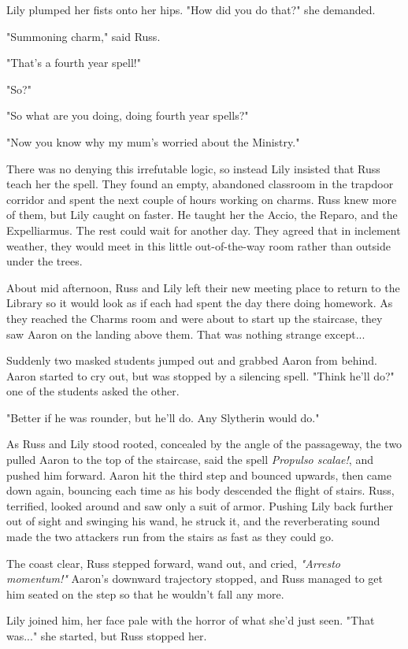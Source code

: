 \documentclass[a4paper,11pt]{article}
\begin{document}
Lily plumped her fists onto her hips. "How did you do that?" she demanded.

"Summoning charm," said Russ.

"That's a fourth year spell!"

"So?"

"So what are you doing, doing fourth year spells?"

"Now you know why my mum's worried about the Ministry."

There was no denying this irrefutable logic, so instead Lily insisted that Russ teach her the spell. They found an empty, abandoned classroom in the trapdoor corridor and spent the next couple of hours working on charms. Russ knew more of them, but Lily caught on faster. He taught her the Accio, the Reparo, and the Expelliarmus. The rest could wait for another day. They agreed that in inclement weather, they would meet in this little out-of-the-way room rather than outside under the trees.

About mid afternoon, Russ and Lily left their new meeting place to return to the Library so it would look as if each had spent the day there doing homework. As they reached the Charms room and were about to start up the staircase, they saw Aaron on the landing above them. That was nothing strange except...

Suddenly two masked students jumped out and grabbed Aaron from behind. Aaron started to cry out, but was stopped by a silencing spell. "Think he'll do?" one of the students asked the other.

"Better if he was rounder, but he'll do. Any Slytherin would do."

As Russ and Lily stood rooted, concealed by the angle of the passageway, the two pulled Aaron to the top of the staircase, said the spell \emph{Propulso scalae!}, and pushed him forward. Aaron hit the third step and bounced upwards, then came down again, bouncing each time as his body descended the flight of stairs. Russ, terrified, looked around and saw only a suit of armor. Pushing Lily back further out of sight and swinging his wand, he struck it, and the reverberating sound made the two attackers run from the stairs as fast as they could go.

The coast clear, Russ stepped forward, wand out, and cried, \emph{"Arresto momentum!"} Aaron's downward trajectory stopped, and Russ managed to get him seated on the step so that he wouldn't fall any more.

Lily joined him, her face pale with the horror of what she'd just seen. "That was..." she started, but Russ stopped her.
\end{document}

